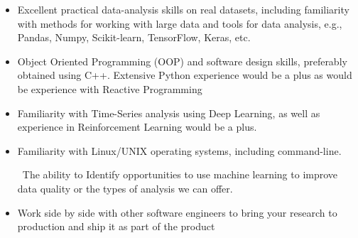 \documentclass[letterpaper]{twentysecondcv} %
\begin{document}
\begin{itemize}
\item Excellent practical data-analysis skills on real datasets, including familiarity with methods for working with large data and tools for data analysis, e.g., Pandas, Numpy, Scikit-learn, TensorFlow, Keras, etc.

\item Object Oriented Programming (OOP) and software design skills, preferably obtained using C++. Extensive Python experience would be a plus as would be experience with Reactive Programming

\item Familiarity with Time-Series analysis using Deep Learning, as well as experience in Reinforcement Learning would be a plus.

\item Familiarity with Linux/UNIX operating systems, including command-line.

\ The ability to Identify opportunities to use machine learning to improve data quality or the types of analysis we can offer.

\item Work side by side with other software engineers to bring your research to production and ship it as part of the product

\end{itemize}
\end{document}
